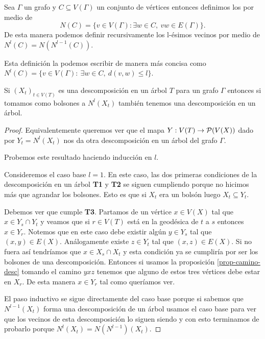\documentclass[tesis.tex]{subfiles}
\begin{document}
\begin{deff}
	Sea $\Gamma$ un grafo y $C \subseteq V(\Gamma)$ un conjunto de vértices entonces definimos los  por medio de 
	\[
	N(C) = \{ v \in V(\Gamma) : \exists w \in C, \ vw \in E(\Gamma) \}.
	\]
	De esta manera podemos definir recursivamente los l-ésimos vecinos por medio de $N^l(C) = N(N^{l-1}(C))$.
\end{deff}

\begin{obs}
	Esta definición la podemos escribir de manera más concisa como $N^l (C) = \{ v \in V(\Gamma) : \ \exists w \in C, \  d(v,w) \le l  \}$.
\end{obs}

\begin{prop}\label{prop-vecinos-desc}
	Si $(X_t)_{t \in V(T)}$ es una descomposición en un árbol $T$ para un grafo $\Gamma$ entonces si tomamos como bolsones a $N^l(X_t)$ también tenemos una descomposición en un árbol.
\end{prop}
\begin{proof}
	Equivalentemente queremos ver que el mapa $Y: V(T) \to {\cal P}(V(X))$ dado por $Y_t = N^l(X_t)$ nos da otra descomposición en un árbol del grafo $\Gamma$.
	
	Probemos este resultado haciendo inducción en $l$.
	
	Consideremos el caso base $l=1$.
	En este caso, las dos primeras condiciones de la descomposición en un árbol \textbf{T1} y \textbf{T2} se siguen cumpliendo porque no hicimos más que agrandar los bolsones. 
	Esto es que si $X_t$ era un bolsón luego $X_t \subseteq Y_t$.
	
	Debemos ver que cumple \textbf{T3}.
	Partamos de un vértice $x \in V(X)$ tal que $x \in Y_s \cap Y_t$ y veamos que si $r \in V(T)$ está en la geodésica de $t$ a $s$ entonces $x \in Y_r$.
	Notemos que en este caso debe existir algún $y \in Y_s$ tal que $(x,y) \in E(X)$.
	Análogamente existe $z \in Y_t$ tal que $(x,z) \in E(X)$.
	Si no fuera así tendríamos que $x \in X_s \cap X_t$ y esta condición ya se cumpliría por ser los bolsones de una descomposición.
	Entonces si usamos la proposición \ref{prop-camino-desc} tomando el camino $yxz$ tenemos que alguno de estos tres vértices debe estar en $X_r$.
	De esta manera $x \in Y_r$ tal como queríamos ver.
	
	El paso inductivo se sigue directamente del caso base porque si sabemos que $N^{l-1}(X_t)$ forma una descomposición de un árbol usamos el caso base para ver que los vecinos de esta descomposición lo siguen siendo y con esto terminamos de probarlo porque $N^l(X_t) = N (N^{l-1})(X_t)$.
\end{proof}
\medskip
\end{document}
